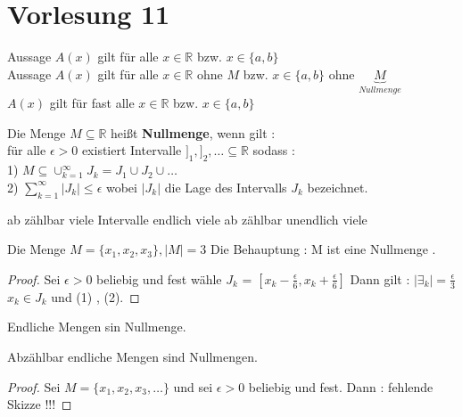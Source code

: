 \section{Vorlesung 11}
\begin{remark}
Aussage $A(x)$ gilt für alle $x \in \mathbb{R}$ bzw. $x \in \{ a , b\}$\\
Aussage $A(x)$ gilt für alle $x \in \mathbb{R}$ ohne $ M$ bzw. $x \in \{ a , b \}$ ohne $\underbrace{M}_{Nullmenge} $\\
$A(x)$ gilt für fast alle $x \in \mathbb{R}$ bzw. $x \in \{ a , b\} $  
\end{remark}
\begin{definition}[Nullmenge]
Die Menge $M \subseteq \mathbb{R}$ heißt \textbf{Nullmenge}, wenn gilt :\\
für alle $\epsilon > 0$ existiert Intervalle $ ]_1 , ]_2 , \dots \subseteq \mathbb{R}$ sodass :\\
1) $M \subseteq \cup_{k=1}^{\infty} J_k = J_1 \cup J_2 \cup \dots$\\
2) $ \sum_{k=1}^{\infty}|J_k| \leq \epsilon$ wobei $|J_k|$ die Lage des Intervalls $J_k$ bezeichnet.
\end{definition}
\begin{remark}
ab zählbar viele Intervalle endlich viele
ab zählbar unendlich viele
\end{remark}
\begin{example}
Die Menge $ M = \{ x_1 , x_2 , x_3 \}, |M| = 3$ Die Behauptung : M ist eine Nullmenge .  
\end{example}
\begin{proof}
Sei $\epsilon > 0 $ beliebig und fest 
wähle $J_k$ = $[x_k - \frac{\epsilon}{6}, x_k + \frac{\epsilon}{6}]$
Dann gilt : $|\exists_k|=\frac{\epsilon}{3}$  $x_k \in J_k$ und (1) , (2).
\end{proof}  
\begin{remark}
Endliche Mengen sin Nullmenge.
\end{remark}
\begin{remark}
Abzählbar endliche Mengen sind Nullmengen.
\end{remark}
\begin{proof}
Sei $ M = \{ x_1 , x_2 , x_3 , \dots \}$ und sei $\epsilon > 0 $ beliebig und fest. Dann :
fehlende Skizze !!! 
\end{proof}
